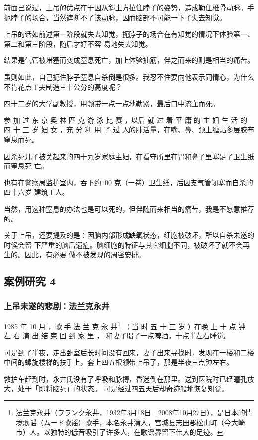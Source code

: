 \documentclass[UTF8]{ctexart}
\begin{document}
前面已说过，上吊的优点在于因从斜上方拉住脖子的姿势，造成勒住椎骨动脉。手扼脖子的场合，当然遮断不了该动脉，因而脑部不可能一下子失去知觉。

上吊的话如前述第一阶段就失去知觉，扼脖子的场合在有知觉的情况下体验第一、第二和第三阶段，随后才好不容
易地失去知觉。

结果是气管被堵塞而变成窒息死亡，加上体验抽筋，伴之而来的则是相当的痛苦。

虽则如此，自己扼住脖子窒息自杀倒是很多。我忍不住要向他表示同情心，为什么不肯花点工夫制造三十公分的高度呢？

四十二岁的大学副教授，用领带一点一点地勒紧，最后口中流血而死。

参 加 过 东 京 奥 林 匹 克 游 泳 比 赛 ，以后 就 过 着 平 庸 的 主 妇 生 活 的 四 十 三 岁 妇 女 ，充 分 利 用 了 过 人的肺活量，在嘴、鼻、颈上缠贴多层胶布窒息而死。

因杀死儿子被关起来的四十九岁家庭主妇，在看守所里在胃和鼻子里塞足了卫生纸而窒息死
亡。

也有在警察局监护室内，吞下约$100$ 克（一卷）卫生纸，后因支气管闭塞而自杀的四十六岁
建筑工人。

当然，用这种窒息的办法也是可以死的，但伴随而来相当的痛苦，我是不愿意推荐的。

关于上吊，还要提及的是：因脑内部形成缺氧状态，细胞被破坏，所以自杀未遂的时候会留
下严重的脑后遗症。脑细胞的特征与其它细胞不同，被破坏了就不会再生的。因此，有必要
做不被发现的周密安排。

\subsection{案例研究 4}
\subsubsection*{上吊未遂的悲剧：法兰克永井}

1985 年 10 月 ，歌 手 法 兰 克 永 井\footnote{法兰克永井（フランク永井，1932年3月18日－2008年10月27日），是日本的情境歌谣（ムード歌谣）歌手，本名永井清人，宫城县志田郡松山町（今大崎市）人。以独特的低音吸引了许多人，在歌谣界留下伟大的足迹。} （ 当 时 五 十 三 岁 ）在晚 上 十 点 钟 左 右 演 出 结 束 回 到 家 里 ， 和妻子喝了一点啤酒，十点半左右睡觉。

可是到了半夜，走出卧室后长时间没有回来，妻子出来寻找时，发现在一楼和二楼中间的螺旋楼梯的扶手上，套上四五根领带上吊了，那是半夜三点钟左右。

救护车赶到时，永井氏没有了呼吸和脉搏，昏迷倒在那里。送到医院时已经瞳孔放大，处于「即将脑死」的状态。
可是经过四五天后却奇迹般地恢复知觉。
\end{document}
